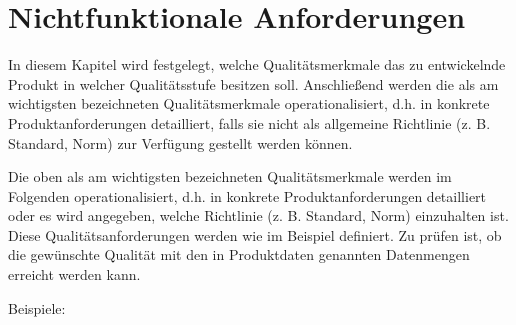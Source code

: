 

\chapter{Nichtfunktionale Anforderungen}
\label{chap:non_functional_req}

In diesem Kapitel wird festgelegt, welche Qualitätsmerkmale das zu entwickelnde
Produkt in welcher Qualitätsstufe besitzen soll. Anschließend werden die als am
wichtigsten bezeichneten Qualitätsmerkmale operationalisiert, d.h. in konkrete
Produktanforderungen detailliert, falls sie nicht als allgemeine Richtlinie (z.
B. Standard, Norm) zur Verfügung gestellt werden können.


Die oben als am wichtigsten bezeichneten Qualitätsmerkmale werden im Folgenden
operationalisiert, d.h. in konkrete Produktanforderungen detailliert oder es
wird angegeben, welche Richtlinie (z. B. Standard, Norm) einzuhalten ist. Diese
Qualitätsanforderungen werden wie im Beispiel definiert. Zu prüfen ist, ob die
gewünschte Qualität mit den in Produktdaten genannten Datenmengen erreicht
werden kann.


Beispiele:

 
